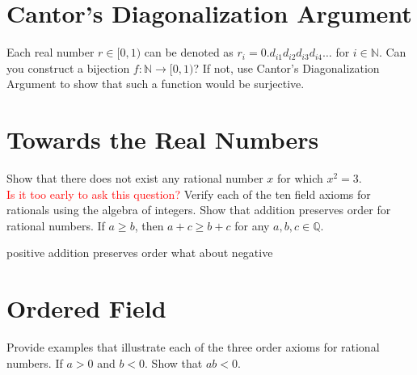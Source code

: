 \documentclass[12pt]{exam}
\begin{document}
\section{Cantor's Diagonalization Argument}
\begin{questions}
\question Each real number $r \in [0,1)$ can be denoted as $r_i = 0.d_{i1}d_{i2}d_{i3}d_{i4}\ldots$ for $i \in \mathbb{N}$. Can you construct a bijection $f : \mathbb{N} \to [0,1)$? If not, use Cantor's Diagonalization Argument to show that such a function would be surjective.
\end{questions}
\section{Towards the Real Numbers}
\begin{questions}
    \question Show that there does not exist any rational number $x$ for which $x^2 = 3$.\\
    \textcolor{red}{Is it too early to ask this question?}
    \question Verify each of the ten field axioms for rationals using the algebra of integers.
    \question Show that addition preserves order for rational numbers. If $a \geq b$, then $a + c \geq b + c$ for any $a, b, c \in \mathbb{Q}$.

    positive addition preserves order
    what about negative 
\end{questions}
\section{Ordered Field}
\begin{questions}
    \question Provide examples that illustrate each of the three order axioms for rational numbers.
    \question If $a > 0$ and $b < 0$. Show that $ab < 0$.
\end{questions}
\end{document}
